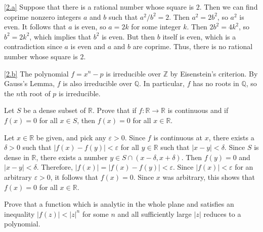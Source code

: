 \documentclass{homework}
\begin{document}
\begin{solution}
\ref{2.a}
Suppose that there is a rational number whose square is $2$.
Then we can find coprime nonzero integers $a$ and $b$ such that $a^2 / b^2 = 2$.
Then $a^2 = 2 b^2$, so $a^2$ is even.
It follows that $a$ is even, so $a = 2 k$ for some integer $k$.
Then $2 b^2 = 4 k^2$, so $b^2 = 2 k^2$, which implies that $b^2$ is even.
But then $b$ itself is even, which is a contradiction since $a$ is even and $a$
and $b$ are coprime.
Thus, there is no rational number whose square is $2$.

\ref{2.b}
The polynomial $f = x^n - p$ is irreducible over $\mathbb{Z}$ by Eisenstein's
criterion.
By Gauss's Lemma, $f$ is also irreducible over $\mathbb{Q}$.
In particular, $f$ has no roots in $\mathbb Q$, so the $n$th root of $p$ is
irreducible.
\end{solution}

\begin{problem}
Let $S$ be a dense subset of $\mathbb R$.
Prove that if $f : \mathbb R \to \mathbb R$ is continuous and if $f(x) = 0$ for
all $x \in S$, then $f(x) = 0$ for all $x \in \mathbb R$.
\end{problem}

\begin{solution}
Let $x \in \mathbb R$ be given, and pick any $\varepsilon > 0$.
Since $f$ is continuous at $x$, there exists a $\delta > 0$ such that
$|f(x) - f(y)| < \varepsilon$ for all $y \in \mathbb R$ such that
$|x - y| < \delta$.
Since $S$ is dense in $\mathbb R$, there exists a number
$y \in S \cap (x - \delta, x + \delta)$.
Then $f(y) = 0$ and $|x - y| < \delta$.
Therefore, $|f(x)| = |f(x) - f(y)| < \varepsilon$.
Since $|f(x)| < \varepsilon$ for an arbitrary $\varepsilon > 0$, it follows that
$f(x) = 0$.
Since $x$ was arbitrary, this shows that $f(x) = 0$ for all $x \in \mathbb R$.
\end{solution}

\begin{problem}[Ahlfors \S4.2.3 \#2, p. 123]
Prove that a function which is analytic in the whole plane and satisfies an
inequality $|f(z)| < |z|^n$ for some $n$ and all sufficiently large $|z|$
reduces to a polynomial.
\end{problem}
\end{document}
